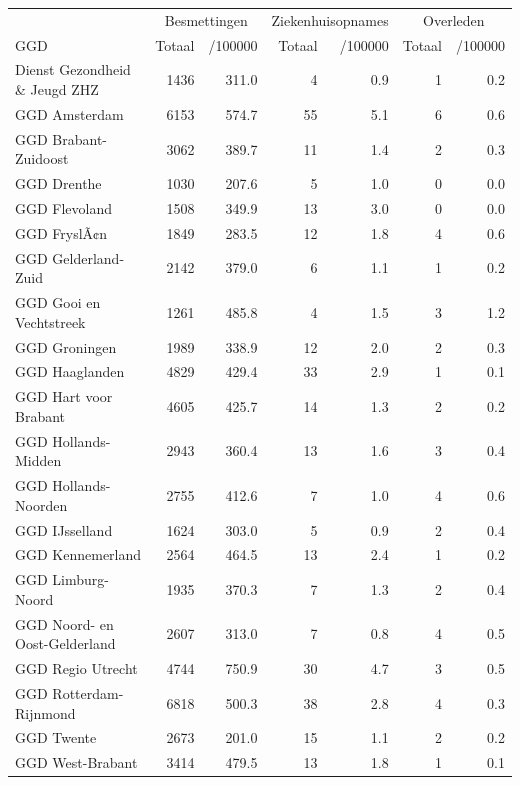 \documentclass[
  english,
  man,floatsintext]{apa6}
\begin{document}
\begin{table}
\centering\begingroup\fontsize{10}{12}\selectfont

\begin{threeparttable}
\begin{tabular}{lrrrrrr}
\toprule
\multicolumn{1}{c}{ } & \multicolumn{2}{c}{Besmettingen} & \multicolumn{2}{c}{Ziekenhuisopnames} & \multicolumn{2}{c}{Overleden} \\
\cmidrule(l{3pt}r{3pt}){2-3} \cmidrule(l{3pt}r{3pt}){4-5} \cmidrule(l{3pt}r{3pt}){6-7}
GGD & Totaal & /100000 & Totaal & /100000 & Totaal & /100000\\
\midrule
Dienst Gezondheid \& Jeugd ZHZ & 1436 & 311.0 & 4 & 0.9 & 1 & 0.2\\
GGD Amsterdam & 6153 & 574.7 & 55 & 5.1 & 6 & 0.6\\
GGD Brabant-Zuidoost & 3062 & 389.7 & 11 & 1.4 & 2 & 0.3\\
GGD Drenthe & 1030 & 207.6 & 5 & 1.0 & 0 & 0.0\\
GGD Flevoland & 1508 & 349.9 & 13 & 3.0 & 0 & 0.0\\
GGD FryslÃ¢n & 1849 & 283.5 & 12 & 1.8 & 4 & 0.6\\
GGD Gelderland-Zuid & 2142 & 379.0 & 6 & 1.1 & 1 & 0.2\\
GGD Gooi en Vechtstreek & 1261 & 485.8 & 4 & 1.5 & 3 & 1.2\\
GGD Groningen & 1989 & 338.9 & 12 & 2.0 & 2 & 0.3\\
GGD Haaglanden & 4829 & 429.4 & 33 & 2.9 & 1 & 0.1\\
GGD Hart voor Brabant & 4605 & 425.7 & 14 & 1.3 & 2 & 0.2\\
GGD Hollands-Midden & 2943 & 360.4 & 13 & 1.6 & 3 & 0.4\\
GGD Hollands-Noorden & 2755 & 412.6 & 7 & 1.0 & 4 & 0.6\\
GGD IJsselland & 1624 & 303.0 & 5 & 0.9 & 2 & 0.4\\
GGD Kennemerland & 2564 & 464.5 & 13 & 2.4 & 1 & 0.2\\
GGD Limburg-Noord & 1935 & 370.3 & 7 & 1.3 & 2 & 0.4\\
GGD Noord- en Oost-Gelderland & 2607 & 313.0 & 7 & 0.8 & 4 & 0.5\\
GGD Regio Utrecht & 4744 & 750.9 & 30 & 4.7 & 3 & 0.5\\
GGD Rotterdam-Rijnmond & 6818 & 500.3 & 38 & 2.8 & 4 & 0.3\\
GGD Twente & 2673 & 201.0 & 15 & 1.1 & 2 & 0.2\\
GGD West-Brabant & 3414 & 479.5 & 13 & 1.8 & 1 & 0.1\\

\end{tabular}
\end{threeparttable}
\end{table}
\end{document}
